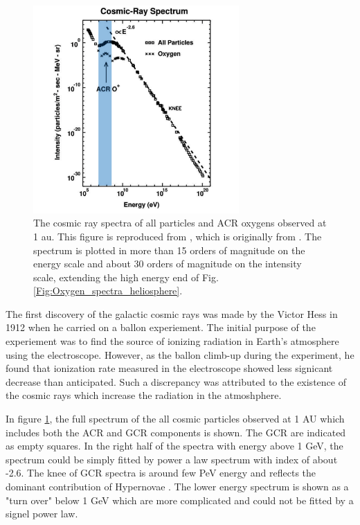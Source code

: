 \begin{figure}
	\centering
	\includegraphics[width = 0.7\textwidth]{images/gcr_spectra_shadow.png}
	
	\caption[The cosmic ray spectra of all particles at 1 au]{The cosmic ray spectra of all particles and ACR oxygens observed at 1 au. This figure is reproduced from \citep{Giacalone2022SSRv, Giacalone2012SSRv}, which is originally from \citep{Jokipii1990AIPC}.
	The spectrum is plotted in more than 15 orders of magnitude on the energy scale and about 30 orders of magnitude on the intensity scale, extending the high energy end of Fig.\ref{Fig:Oxygen_spectra_heliosphere}.}
	\label{Fig:Oxygen_spectra_cosmic_ray}
\end{figure}
The first discovery of the galactic cosmic rays was made by the Victor Hess in 1912 when he carried on a ballon experiement. The initial purpose of the experiement was to find the source of ionizing radiation in Earth's atmosphere using the electroscope. However, as the ballon climb-up during the experiment, he found that ionization rate measured in the electroscope showed less signicant decrease than anticipated. Such a discrepancy was attributed to the existence of the cosmic rays which increase the radiation in the atmoshphere.

In figure \ref{Fig:Oxygen_spectra_cosmic_ray}, the full spectrum of the all cosmic particles observed at 1 AU which includes both the \ac{ACR} and \ac{GCR} components is shown. The \acs{GCR} are indicated as empty squares. In the right half of the spectra with energy above 1 GeV, the spectrum could be simply fitted by power a law spectrum with index of about -2.6. The knee of GCR spectra is around few PeV energy and reflects the dominant contribution of Hypernovae \citep{Sveshnikova2003AA,Hoerandel2003APh}. The lower energy spectrum is shown as a "turn over" below 1 GeV which are more complicated and could not be fitted by a signel power law. 

